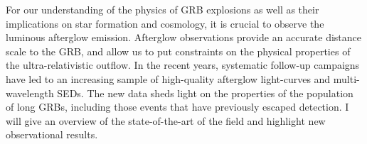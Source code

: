 


\bigskip



\bigskip

\noindent For our understanding of the physics of GRB explosions as well as their implications on star formation and cosmology, it is crucial to observe the luminous afterglow emission. Afterglow observations provide an accurate distance scale to the GRB, and allow us to put constraints on the physical properties of the ultra-relativistic outflow. In the recent years, systematic follow-up campaigns have led to an increasing sample of high-quality afterglow light-curves and multi-wavelength SEDs. The new data sheds light on the properties of the population of long GRBs, including those events that have previously escaped detection.
I will give an overview of the state-of-the-art of the field and highlight new observational results.
